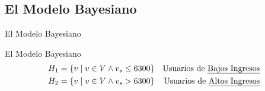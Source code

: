 \documentclass[usenames,dvipsnames,table]{beamer}
\begin{document}
\subsection{El Modelo Bayesiano}

\begin{frame}{El Modelo Bayesiano}
	
\end{frame}

\begin{frame}{El Modelo Bayesiano}
	\begin{align*}
		H_1 &= \left\{ v \mid v \in V \wedge v_s \leq 6300 \right\} &\text{Usuarios de \emph{Bajos Ingresos}} \\
		H_2 &= \left\{ v \mid v \in V \wedge v_s >    6300 \right\} &\text{Usuarios de \emph{Altos Ingresos}}
	\end{align*}
\end{frame}
\end{document}
